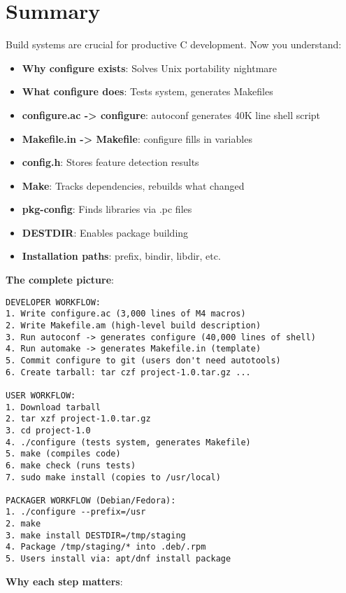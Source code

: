 \section{Summary}

Build systems are crucial for productive C development. Now you understand:

\begin{itemize}
    \item \textbf{Why configure exists}: Solves Unix portability nightmare
    \item \textbf{What configure does}: Tests system, generates Makefiles
    \item \textbf{configure.ac -> configure}: autoconf generates 40K line shell script
    \item \textbf{Makefile.in -> Makefile}: configure fills in variables
    \item \textbf{config.h}: Stores feature detection results
    \item \textbf{Make}: Tracks dependencies, rebuilds what changed
    \item \textbf{pkg-config}: Finds libraries via .pc files
    \item \textbf{DESTDIR}: Enables package building
    \item \textbf{Installation paths}: prefix, bindir, libdir, etc.
\end{itemize}

\textbf{The complete picture}:

\begin{verbatim}
DEVELOPER WORKFLOW:
1. Write configure.ac (3,000 lines of M4 macros)
2. Write Makefile.am (high-level build description)
3. Run autoconf -> generates configure (40,000 lines of shell)
4. Run automake -> generates Makefile.in (template)
5. Commit configure to git (users don't need autotools)
6. Create tarball: tar czf project-1.0.tar.gz ...

USER WORKFLOW:
1. Download tarball
2. tar xzf project-1.0.tar.gz
3. cd project-1.0
4. ./configure (tests system, generates Makefile)
5. make (compiles code)
6. make check (runs tests)
7. sudo make install (copies to /usr/local)

PACKAGER WORKFLOW (Debian/Fedora):
1. ./configure --prefix=/usr
2. make
3. make install DESTDIR=/tmp/staging
4. Package /tmp/staging/* into .deb/.rpm
5. Users install via: apt/dnf install package
\end{verbatim}

\textbf{Why each step matters}:

